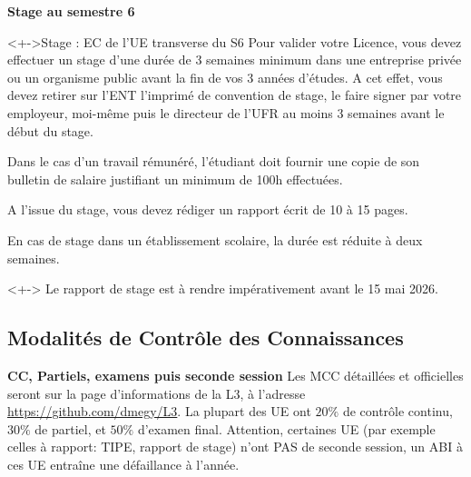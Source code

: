 \documentclass{beamer}
\begin{document}


\begin{frame}
{\bf Stage au semestre 6  }
\begin{block}<+->{Stage : EC de l'UE transverse du S6} 
Pour valider votre Licence, vous devez effectuer un stage d'une durée de 3 semaines minimum  dans une entreprise privée ou un organisme public avant la fin de vos 3 années d'études. A cet effet, vous devez retirer sur l'ENT  l'imprimé de convention de stage, le faire signer par votre employeur, moi-même puis le directeur de l'UFR {\color{red} au moins 3 semaines avant le début du stage}.

Dans le cas d'un travail rémunéré, l'étudiant doit fournir une copie de son bulletin de salaire justifiant un minimum de 100h effectuées.  

A l'issue du stage, vous devez rédiger un rapport écrit de 10 à 15 pages.

En cas de stage dans un établissement scolaire, la durée est réduite à deux semaines.
\end{block}
\begin{alertblock}<+->{} Le rapport de stage est à rendre impérativement avant le 15 mai 2026.
\end{alertblock}
\end{frame}


\subsection{Modalités de Contrôle des Connaissances}
\begin{frame}{\bf  CC, Partiels, examens puis seconde session}
Les MCC détaillées et officielles seront sur la page d'informations de la L3, à l'adresse \url{https://github.com/dmegy/L3}. La plupart des UE ont $20\%$ de contrôle continu, $30\%$ de partiel, et $50\%$ d'examen final. Attention, certaines UE (par exemple celles \og à rapport\fg:  TIPE, rapport de stage) n'ont PAS de seconde session, un ABI à ces UE entraîne une défaillance à l'année. 
\end{frame}
\end{document}

